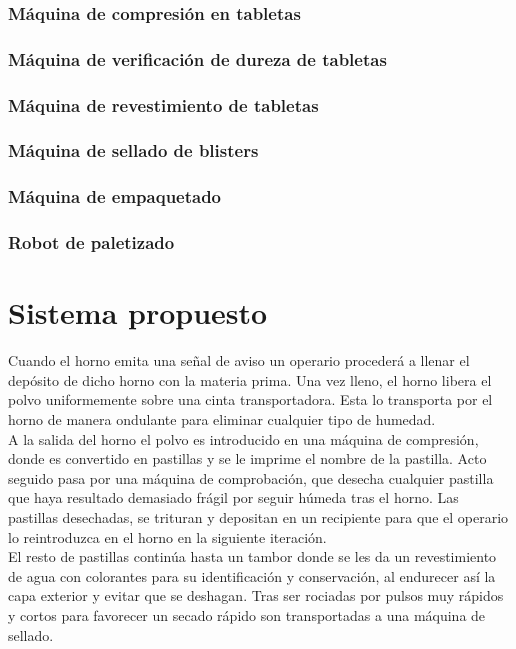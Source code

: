 	\subsubsection{Máquina de compresión en tabletas}
	\subsubsection{Máquina de verificación de dureza de tabletas}
	\subsubsection{Máquina de revestimiento de tabletas}
	\subsubsection{Máquina de sellado de blisters }
	
	\subsubsection{Máquina de empaquetado}
	\subsubsection{Robot de paletizado}
\section{Sistema propuesto}


Cuando el horno emita una señal de aviso un operario procederá a llenar el depósito de dicho horno con la materia prima. Una vez lleno, el horno libera el polvo uniformemente sobre una cinta transportadora. Esta lo transporta por el horno de manera ondulante para eliminar cualquier tipo de humedad. 
\\

A la salida del horno el polvo es introducido en una máquina de compresión, donde es convertido en pastillas y se le imprime el nombre de la pastilla.  Acto seguido pasa por una máquina de comprobación, que desecha cualquier pastilla que haya resultado demasiado frágil por seguir húmeda tras el horno. Las pastillas desechadas, se trituran y depositan en un recipiente para que el operario lo reintroduzca en el horno en la siguiente iteración. 
\\

El resto de pastillas continúa hasta un tambor donde se les da un revestimiento de agua con colorantes para su identificación y conservación, al endurecer así la capa exterior y evitar que se deshagan. Tras ser rociadas por pulsos muy rápidos y cortos para favorecer un secado rápido son transportadas a una máquina de sellado.
\\

